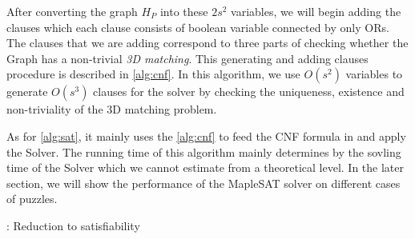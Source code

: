 \documentclass[11pt]{article}
\begin{document}
After converting the graph $H_P$ into these $2s^2$ variables, we will
begin adding the clauses which each clause consists of boolean
variable connected by only ORs. The clauses that we are adding
correspond to three parts of checking whether the Graph has a
non-trivial \emph{3D matching}. This generating and adding clauses
procedure is described in \autoref{alg:cnf}. In this algorithm, we use
$O(s^2)$ variables to generate $O(s^3)$ clauses for the solver by
checking the uniqueness, existence and non-triviality of the 3D
matching problem.

As for \autoref{alg:sat}, it mainly uses the \autoref{alg:cnf} to feed
the CNF formula in and apply the Solver. The running time of this
algorithm mainly determines by the sovling time of the Solver which we
cannot estimate from a theoretical level. In the later section, we
will show the performance of the MapleSAT solver on different cases of
puzzles.


\label{subsec:sat}

\begin{algorithm}
  \caption{: Reduction to satisfiability}
  \label{alg:sat}
\begin{algorithmic}[1]
  \Else
  \EndIf
  \EndFunction
\end{algorithmic}
\end{algorithm}
\end{document}
